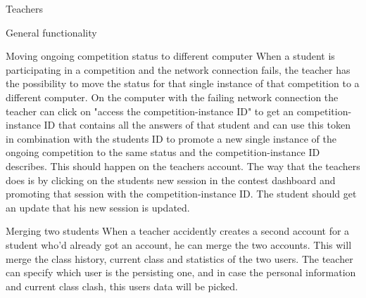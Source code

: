 \begin{section}{Teachers}
\begin{subsection}{General functionality}
\begin{subsubsection}{Moving ongoing competition status to different computer}
            When a student is participating in a competition and the network connection fails, the teacher has the possibility to move the status for that single instance of that competition to a different computer. On the computer with the failing network connection the teacher can click on "access the competition-instance ID" to get an competition-instance ID that contains all the answers of that student and can use this token in combination with the students ID to promote a new single instance of the ongoing competition to the same status and the competition-instance ID describes. This should happen on the teachers account. The way that the teachers does is by clicking on the students new session in the contest dashboard and promoting that session with the competition-instance ID. The student should get an update that his new session is updated. 
        \end{subsubsection}

        \begin{subsubsection}{Merging two students}
            When a teacher accidently creates a second account for a student
            who'd already got an account, he can merge the two accounts. This
            will merge the class history, current class and statistics of the
            two users. The teacher can specify which user is the persisting one,
            and in case the personal information and current class clash, this
            users data will be picked.
        \end{subsubsection}
    \end{subsection}

\end{section}
